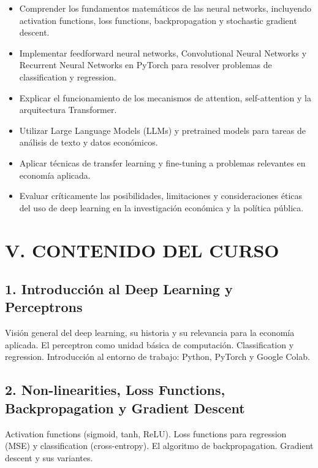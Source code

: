 \documentclass[11pt,a4paper]{article}
\begin{document}
\begin{itemize}[leftmargin=2cm]
    \item Comprender los fundamentos matem\'aticos de las neural networks, incluyendo activation functions, loss functions, backpropagation y stochastic gradient descent.
    \item Implementar feedforward neural networks, Convolutional Neural Networks y Recurrent Neural Networks en PyTorch para resolver problemas de classification y regression.
    \item Explicar el funcionamiento de los mecanismos de attention, self-attention y la arquitectura Transformer.
    \item Utilizar Large Language Models (LLMs) y pretrained models para tareas de an\'alisis de texto y datos econ\'omicos.
    \item Aplicar t\'ecnicas de transfer learning y fine-tuning a problemas relevantes en econom\'ia aplicada.
    \item Evaluar cr\'iticamente las posibilidades, limitaciones y consideraciones \'eticas del uso de deep learning en la investigaci\'on econ\'omica y la pol\'itica p\'ublica.
\end{itemize}

\section*{V. CONTENIDO DEL CURSO}

\subsection*{1. Introducci\'on al Deep Learning y Perceptrons}

Visi\'on general del deep learning, su historia y su relevancia para la econom\'ia aplicada. El perceptron como unidad b\'asica de computaci\'on. Classification y regression. Introducci\'on al entorno de trabajo: Python, PyTorch y Google Colab.

\subsection*{2. Non-linearities, Loss Functions, Backpropagation y Gradient Descent}

Activation functions (sigmoid, tanh, ReLU). Loss functions para regression (MSE) y classification (cross-entropy). El algoritmo de backpropagation. Gradient descent y sus variantes.
\end{document}
